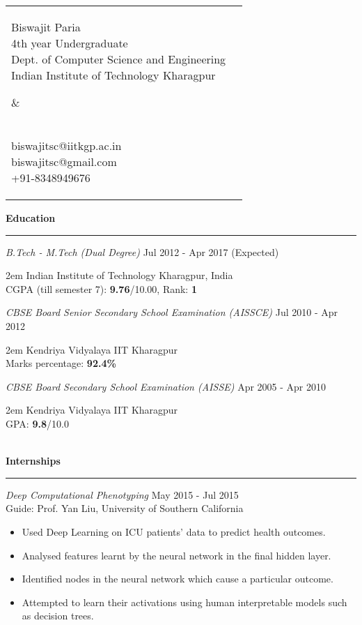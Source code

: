 \documentclass[a4paper,10pt,oneside]{article}
\makeatletter
\newcommand{\heading}[1]{
 {\Large \textbf{#1}}
  \vspace{0.4em}
  \hrule
  \vspace{0.4em}
}
\newcommand{\columnsplit}[4]{
  \begin{tabular*}{\textwidth}{l@{\cftdotfill{\cftsecdotsep}\extracolsep{\fill}}r}
   \parbox{#1}{
    \begin{flushleft}
     #2
    \end{flushleft}
   } &
   \parbox{#3}{
    \begin{flushright}
     #4
    \end{flushright}
   }
  \end{tabular*}
}
\newcommand{\SmallEntryGap}{ \vspace{0.6em} }
\newcommand{\EntryGap}{ ~\\ }
\newcommand{\doindent}[1]{\begin{adjustwidth}{2em}{} #1 \end{adjustwidth}}
\makeatother
\begin{document}


\columnsplit{4in}{
  {\huge Biswajit Paria}\\
  4th year Undergraduate\\
  Dept. of Computer Science and Engineering\\
  Indian Institute of Technology Kharagpur
  }
  {2in}{
  ~\\[1.3em]
  biswajitsc@iitkgp.ac.in\\
  biswajitsc@gmail.com\\
  +91-8348949676
  }

  


\heading{Education}

\SmallEntryGap
\emph{B.Tech - M.Tech (Dual Degree)} \hfill Jul 2012 - Apr 2017 (Expected)\\
  \doindent{Indian Institute of Technology Kharagpur, India\\
  CGPA (till semester 7): \textbf{9.76}/10.00, Rank: \textbf{1}}

\SmallEntryGap
  \emph{CBSE Board Senior Secondary School Examination (AISSCE)} \hfill Jul 2010 - Apr 2012\\
  \doindent{Kendriya Vidyalaya IIT Kharagpur\\
  Marks percentage: \textbf{92.4\%}}

\SmallEntryGap
\emph{CBSE Board Secondary School Examination (AISSE)} \hfill Apr 2005 - Apr 2010\\
  \doindent{Kendriya Vidyalaya IIT Kharagpur\\
  GPA: \textbf{9.8}/10.0}

\EntryGap


\heading{Internships}
\SmallEntryGap
\emph{Deep Computational Phenotyping} \hfill May 2015 - Jul 2015\\
Guide: Prof. Yan Liu, University of Southern California
\begin{itemize}[noitemsep, nolistsep]
 \item Used Deep Learning on ICU patients' data to predict health outcomes.
 \item Analysed features learnt by the neural network in the final hidden layer.
 \item Identified nodes in the neural network which cause a particular outcome.
 \item Attempted to learn their activations using human interpretable models such as decision trees.
\end{itemize}
\end{document}
